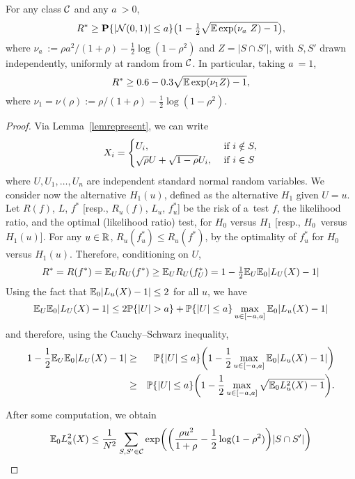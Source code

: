 \documentclass[10pt, oneside]{article}
\begin{document}
\begin{prop}
  \label{thmlower}
For any class ${\mathcal C}$ and any $a~> 0$,
\[
R^* \geq\mathbf{P}\{|{\mathcal N}(0,1)| \le a\} \bigl(1 - \tfrac12 \sqrt{\mathbb{E}
\exp
(\nu_a~Z ) - 1}\bigr),
\]
where $\nu_a~:= \rho a^2/(1+\rho)- \frac12 \log(1-\rho^2)$ and
$Z=|S \cap S'|$, with $S, S'$ drawn independently, uniformly at random
from ${\mathcal C}$. In particular, taking $a~= 1$,
\[
R^* \geq0.6 - 0.3 \sqrt{\mathbb{E}\exp(\nu_1 Z ) - 1},
\]
where $\nu_1 = \nu(\rho) := \rho/(1+\rho)- \frac12 \log(1-\rho^2)$.
\end{prop}

\begin{proof}
  Via Lemma~\ref{lemrepresent}, we can write 
    \[
    X_i = \begin{cases}
    U_i, \quad & \mbox{ if } i \notin S, \cr
    \sqrt{\rho}  U + \sqrt{1-\rho}  U_i, & \mbox{ if } i \in S
    \end{cases}
    \]
  where $U,U_1,\ldots,U_n$ are independent standard normal random variables.
  We consider now the alternative $H_1(u)$, defined as the alternative
$H_1$ given \mbox{$U=u$}.
Let $R(f)$, $L$, $f^*$ [resp., $R_u(f)$, $L_u$, $f_u^*$] be the risk of
a~test $f$, the likelihood ratio, and the optimal (likelihood ratio)
test, for $H_0$ versus $H_1$ [resp., $H_0$~versus $H_1(u)$]. For any $u
\in{\mathbb R}$, $R_u(f_u^*) \leq R_u(f^*)$, by the optimality of $f_u^*$
for $H_0$ versus $H_1(u)$. Therefore, conditioning on $U$,
$$R^* = R(f^*) = \mathbb{E}_{U} R_U(f^*) \geq \mathbb{E}_{U} R_U(f_U^*) = 1 - \tfrac{1}{2} \mathbb{E}_{U} \mathbb{E}_0 |L_U(X) - 1|$$
Using the fact that
$\mathbb{E}_0 |L_u(X) - 1| \le2$ for all $u$, we have
%
\[
\bE_{U} \bE_0 |L_U(X) - 1|
\le2\bP\{|U|>a\} + \bP\{|U|\le a\} \max_{u \in[-a,a]} \bE_0
|L_u(X) - 1|
\]
%
and therefore, using the Cauchy--Schwarz inequality,
%
\begin{eqnarray*}
1 - \frac{1}{2} \mathbb{E}_{U} \mathbb{E}_0 |L_U(X) - 1|
& \ge&
\mathbb{P}\{|U|\le a\}\biggl( 1-\frac{1}{2}\max_{u \in[-a,a]} \mathbb{E}_0
|L_u(X) - 1|\biggr)
\\
& \geq& \mathbb{P}\{|U|\le a\}\biggl(1 - \frac12 \max_{u \in[-a,a]}
\sqrt{\mathbb{E}_0 L_u^2(X) - 1}\biggr).
\end{eqnarray*}

After some computation, we obtain 
$$\mathbb{E}_0 L_u^2(X) \le \frac{1}{N^2} \sum_{S, S' \in{\mathcal C}}
\exp\biggl(\biggl(\frac{\rho u^2}{1+\rho}- \frac12\log(1-\rho
^2)\biggr) |S \cap S'| \biggr)$$
\end{proof}
\end{document}
